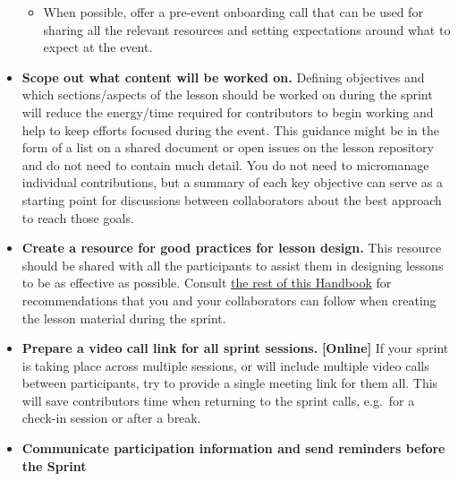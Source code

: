 \documentclass[
]{book}
\providecommand{\tightlist}{%
  \setlength{\itemsep}{0pt}\setlength{\parskip}{0pt}}
\begin{document}
\begin{itemize}
  \begin{itemize}
  \tightlist
  \item
    When possible, offer a pre-event onboarding call that can be used for sharing all the relevant resources and setting expectations around what to expect at the event.
  \end{itemize}
\item
  \textbf{Scope out what content will be worked on.}
  Defining objectives and which sections/aspects of the lesson should be worked on during the sprint
  will reduce the energy/time required for contributors to begin working and help to keep efforts focused during the event.
  This guidance might be in the form of a list on a shared document or open issues on the lesson repository and do not need to contain much detail.
  You do not need to micromanage individual contributions,
  but a summary of each key objective can serve as a starting point for discussions between collaborators about the best approach to reach those goals.
\item
  \textbf{Create a resource for good practices for lesson design.} This resource should be shared with all the participants to assist them in designing lessons to be as effective as possible.
  Consult \href{https://cdh.carpentries.org}{the rest of this Handbook}
  for recommendations that you and your collaborators can follow when creating the lesson material during the sprint.
\item
  \textbf{Prepare a video call link for all sprint sessions.}
  \textbf{{[}Online{]}} If your sprint is taking place across multiple sessions,
  or will include multiple video calls between participants, try to provide a single meeting link for them all.
  This will save contributors time when returning to the sprint calls, e.g.~for a check-in session or after a break.
\item
  \textbf{Communicate participation information and send reminders before the Sprint}


\end{itemize}
\end{document}
